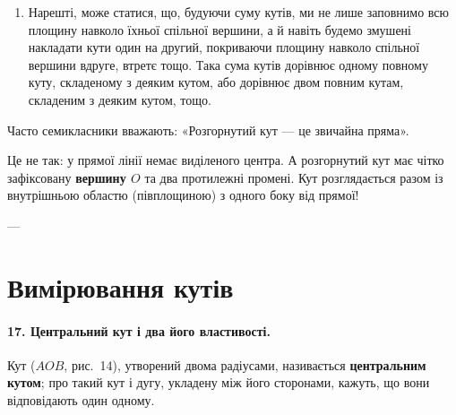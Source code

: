\begin{enumerate}
\begin{center}
    \end{center}

    \item Нарешті, може статися, що, будуючи суму кутів, ми не лише заповнимо всю площину навколо їхньої спільної вершини, а й навіть будемо змушені накладати кути один на другий, покриваючи площину навколо спільної вершини вдруге, втретє тощо. Така сума кутів дорівнює одному повному куту, складеному з деяким кутом, або дорівнює двом повним кутам, складеним з деяким кутом, тощо.
\end{enumerate}

\begin{warningbox}
Часто семикласники вважають: «Розгорнутий кут — це звичайна пряма».

Це не так: у прямої лінії немає виділеного центра. А розгорнутий кут має чітко зафіксовану \textbf{вершину $O$} та два протилежні промені. Кут розглядається разом із внутрішньою областю (півплощиною) з одного боку від прямої!
\end{warningbox}

---

\section{Вимірювання кутів}

\paragraph{17. Центральний кут і два його властивості.}
Кут ($AOB$, рис.~14), утворений двома радіусами, називається \textbf{центральним кутом}; про такий кут і дугу, укладену між його сторонами, кажуть, що вони відповідають один одному.

